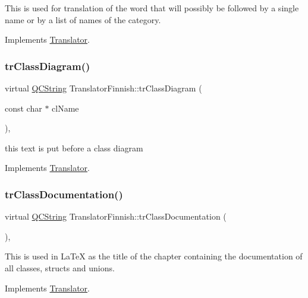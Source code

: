 This is used for translation of the word that will possibly be followed by a single name or by a list of names of the category. 

Implements \mbox{\hyperlink{class_translator}{Translator}}.

\mbox{\label{class_translator_finnish_a1163a2254cdba54461575257ca77fd9f}} 
\subsubsection{\texorpdfstring{trClassDiagram()}{trClassDiagram()}}
{\footnotesize\ttfamily virtual \mbox{\hyperlink{class_q_c_string}{Q\+C\+String}} Translator\+Finnish\+::tr\+Class\+Diagram (\begin{DoxyParamCaption}\item[{const char $\ast$}]{cl\+Name }\end{DoxyParamCaption})\hspace{0.3cm}{\ttfamily [inline]}, {\ttfamily [virtual]}}

this text is put before a class diagram 

Implements \mbox{\hyperlink{class_translator}{Translator}}.

\mbox{\label{class_translator_finnish_ab4ebf52ef81486d5cabcf4a6ebeed2ce}} 
\subsubsection{\texorpdfstring{trClassDocumentation()}{trClassDocumentation()}}
{\footnotesize\ttfamily virtual \mbox{\hyperlink{class_q_c_string}{Q\+C\+String}} Translator\+Finnish\+::tr\+Class\+Documentation (\begin{DoxyParamCaption}{ }\end{DoxyParamCaption})\hspace{0.3cm}{\ttfamily [inline]}, {\ttfamily [virtual]}}

This is used in La\+TeX as the title of the chapter containing the documentation of all classes, structs and unions. 

Implements \mbox{\hyperlink{class_translator}{Translator}}.

